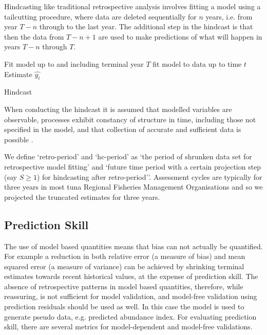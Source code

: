 Hindcasting like traditional retrospective analysis involves fitting a model using a tailcutting procedure, where data are deleted sequentially for $n$ years, i.e. from year $T-n$ through to the last year. The additional step in the hindcast is that then the data from $T - n + 1$ are used to make predictions of what will happen in years $T - n$ through $T$. 

\begin{algorithm}[!ht]
\begin{algorithmic}[1]
\State Fit model up to and including terminal year $T$
\State fit model to data up to time $t$  
\State Estimate $\hat{y_i}$
\EndFor
\EndFor
\caption{Hindcast}
\label{Hindcast}
\end{algorithmic}
\end{algorithm}

When conducting the hindcast it is assumed that modelled variables are observable, processes exhibit constancy of structure in time, including those not specified in the model, and that collection of accurate and sufficient data is possible \parencite{hodges1992you}.

We  define `retro-period' and `hc-period' as `the period of shrunken data set for retrospective model fitting' and `future time period with a certain projection step (say $S \geq 1$) for hindcasting after retro-period''. Assessment cycles are typically for three years in most tuna Regional Fisheries Management Organisations and so we projected the truncated estimates for three years. 

\subsection*{Prediction Skill}

The use of model based quantities means that bias can not actually be quantified. For example a reduction in both relative error (a measure of bias) and mean squared error (a measure of variance) can be achieved by shrinking terminal estimates towards recent historical values, at the expense of prediction skill. The absence of retrospective patterns in model based quantities, therefore, while reassuring, is not sufficient for model validation, and model-free validation using prediction residuals should be used as well.  In this case the model is used to generate pseudo data, e.g. predicted abundance index. For evaluating prediction skill, there are several metrics for model-dependent and model-free validations. 

